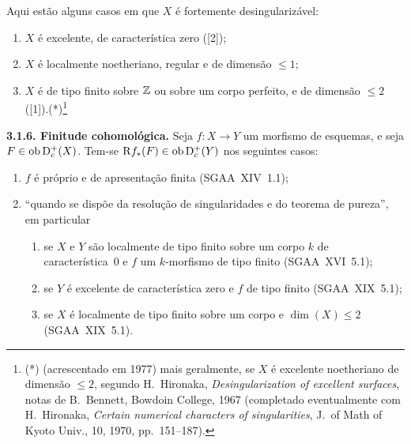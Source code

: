 Aqui estão alguns casos em que $X$ é fortemente desingularizável:
\begin{enumerate}
\item[a)] $X$ é excelente, de característica zero ([2]);
\item[b)] $X$ é localmente noetheriano, regular e de dimensão $\leqslant 1$;
\item[c)] $X$ é de tipo finito sobre $\mathbb{Z}$ ou sobre um corpo perfeito, e de dimensão $\leqslant 2$ ([1]).(*)\footnote{(*) (acrescentado em 1977) mais geralmente, se $X$ é excelente noetheriano de dimensão $\leqslant 2$, segundo H.~Hironaka, \emph{Desingularization of excellent surfaces}, notas de B.~Bennett, Bowdoin College, 1967 (completado eventualmente com H.~Hironaka, \emph{Certain numerical characters of singularities}, J.~of Math of Kyoto Univ., 10, 1970, pp.~151--187).}
\end{enumerate}

\textbf{3.1.6. Finitude cohomológica.} Seja $f : X \to Y$ um morfismo de esquemas, e seja $F \in \operatorname{ob} \mathrm{D}_c^{+}(X)$. Tem-se $\mathrm{R} f_{*}(F) \in \operatorname{ob} \mathrm{D}_c^{+}(Y)$ nos seguintes casos:
\begin{enumerate}
\item[a)] $f$ é próprio e de apresentação finita (SGAA~XIV~1.1);
\item[b)] \textquotedblleft quando se dispõe da resolução de singularidades e do teorema de pureza\textquotedblright{}, em particular
\begin{enumerate}
\item[(i)] se $X$ e $Y$ são localmente de tipo finito sobre um corpo $k$ de característica~0 e $f$ um $k$-morfismo de tipo finito (SGAA~XVI~5.1);
\item[(ii)] se $Y$ é excelente de característica zero e $f$ de tipo finito (SGAA~XIX~5.1);
\item[(iii)] se $X$ é localmente de tipo finito sobre um corpo e $\dim(X) \leqslant 2$ (SGAA~XIX~5.1).
\end{enumerate}
\end{enumerate}
